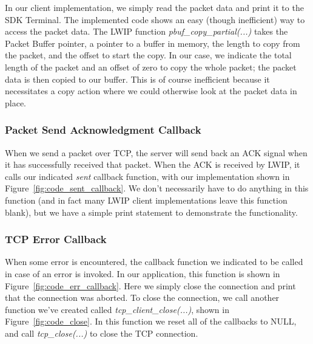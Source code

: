 \documentclass[11pt]{article}
\begin{document}
In our client implementation, we simply read the packet data and print it to the SDK Terminal. The implemented code shows an easy (though inefficient) way to access the packet data. The LWIP function \textit{pbuf\_copy\_partial(...)} takes the Packet Buffer pointer, a pointer to a buffer in memory, the length to copy from the packet, and the offset to start the copy. In our case, we indicate the total length of the packet and an offset of zero to copy the whole packet; the packet data is then copied to our buffer. This is of course inefficient because it necessitates a copy action where we could otherwise look at the packet data in place.

\subsubsection*{Packet Send Acknowledgment Callback}
When we send a packet over TCP, the server will send back an ACK signal when it has successfully received that packet. When the ACK is received by LWIP, it calls our indicated \textit{sent} callback function, with our implementation shown in Figure~\ref{fig:code_sent_callback}. We don't necessarily have to do anything in this function (and in fact many LWIP client implementations leave this function blank), but we have a simple print statement to demonstrate the functionality.

\subsubsection*{TCP Error Callback}
When some error is encountered, the callback function we indicated to be called in case of an error is invoked. In our application, this function is shown in Figure~\ref{fig:code_err_callback}. Here we simply close the connection and print that the connection was aborted. To close the connection, we call another function we've created called \textit{tcp\_client\_close(...)}, shown in Figure~\ref{fig:code_close}. In this function we reset all of the callbacks to NULL, and call \textit{tcp\_close(...)} to close the TCP connection.
\end{document}
